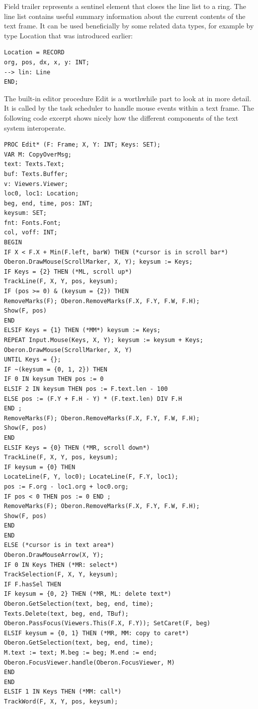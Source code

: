 Field trailer represents a sentinel element that closes the line list to a ring.
The line list contains useful summary information about the current contents of the text frame. It can
be used beneficially by some related data types, for example by type Location that was introduced
earlier:
\begin{verbatim}
Location = RECORD
org, pos, dx, x, y: INT;
--> lin: Line
END;
\end{verbatim}

The built-in editor procedure Edit is a worthwhile part to look at in more detail. It is called by the task
scheduler to handle mouse events within a text frame. The following code excerpt shows nicely
how the different components of the text system interoperate.
\begin{verbatim}
PROC Edit* (F: Frame; X, Y: INT; Keys: SET);
VAR M: CopyOverMsg;
text: Texts.Text;
buf: Texts.Buffer;
v: Viewers.Viewer;
loc0, loc1: Location;
beg, end, time, pos: INT;
keysum: SET;
fnt: Fonts.Font;
col, voff: INT;
BEGIN
IF X < F.X + Min(F.left, barW) THEN (*cursor is in scroll bar*)
Oberon.DrawMouse(ScrollMarker, X, Y); keysum := Keys;
IF Keys = {2} THEN (*ML, scroll up*)
TrackLine(F, X, Y, pos, keysum);
IF (pos >= 0) & (keysum = {2}) THEN
RemoveMarks(F); Oberon.RemoveMarks(F.X, F.Y, F.W, F.H);
Show(F, pos)
END
ELSIF Keys = {1} THEN (*MM*) keysum := Keys;
REPEAT Input.Mouse(Keys, X, Y); keysum := keysum + Keys;
Oberon.DrawMouse(ScrollMarker, X, Y)
UNTIL Keys = {};
IF ~(keysum = {0, 1, 2}) THEN
IF 0 IN keysum THEN pos := 0
ELSIF 2 IN keysum THEN pos := F.text.len - 100
ELSE pos := (F.Y + F.H - Y) * (F.text.len) DIV F.H
END ;
RemoveMarks(F); Oberon.RemoveMarks(F.X, F.Y, F.W, F.H);
Show(F, pos)
END
ELSIF Keys = {0} THEN (*MR, scroll down*)
TrackLine(F, X, Y, pos, keysum);
IF keysum = {0} THEN
LocateLine(F, Y, loc0); LocateLine(F, F.Y, loc1);
pos := F.org - loc1.org + loc0.org;
IF pos < 0 THEN pos := 0 END ;
RemoveMarks(F); Oberon.RemoveMarks(F.X, F.Y, F.W, F.H);
Show(F, pos)
END
END
ELSE (*cursor is in text area*)
Oberon.DrawMouseArrow(X, Y);
IF 0 IN Keys THEN (*MR: select*)
TrackSelection(F, X, Y, keysum);
IF F.hasSel THEN
IF keysum = {0, 2} THEN (*MR, ML: delete text*)
Oberon.GetSelection(text, beg, end, time);
Texts.Delete(text, beg, end, TBuf);
Oberon.PassFocus(Viewers.This(F.X, F.Y)); SetCaret(F, beg)
ELSIF keysum = {0, 1} THEN (*MR, MM: copy to caret*)
Oberon.GetSelection(text, beg, end, time);
M.text := text; M.beg := beg; M.end := end;
Oberon.FocusViewer.handle(Oberon.FocusViewer, M)
END
END
ELSIF 1 IN Keys THEN (*MM: call*)
TrackWord(F, X, Y, pos, keysum);

\end{verbatim}
